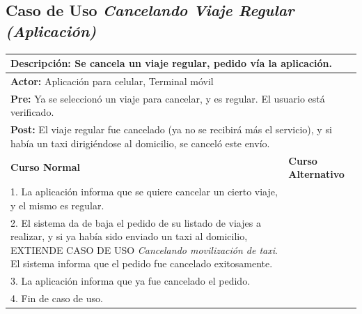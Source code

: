 \documentclass[a4paper]{article}
\begin{document}
\subsection{Caso de Uso \textit{Cancelando Viaje Regular (Aplicaci\'on)}}
\begin{center}
\begin{tabular}{|p{10cm} | p{6cm}|}
\hline
\multicolumn{2}{|p{16cm}|}{\textbf{Descripci\'on:} Se cancela un viaje regular, pedido v\'ia la aplicaci\'on. } \\
\hline
\multicolumn{2}{|l|}{\textbf{Actor:} Aplicaci\'on para celular, Terminal m\'ovil} \\
\hline
\multicolumn{2}{|l|}{\textbf{Pre:} Ya se seleccion\'o un viaje para cancelar, y es regular. El usuario est\'a verificado.} \\
\hline
\multicolumn{2}{|p{16cm}|}{\textbf{Post:} El viaje regular fue cancelado (ya no se recibir\'a m\'as el servicio), y si hab\'ia un taxi dirigi\'endose al domicilio, se cancel\'o este env\'io.}\\
\hline
\textbf{Curso Normal}  & \textbf{Curso Alternativo} \\ \hline
1. La aplicaci\'on informa que se quiere cancelar un cierto viaje, y el mismo es regular. & \\ \hline
2. El sistema da de baja el pedido de su listado de viajes a realizar, y si ya hab\'ia sido enviado un taxi al domicilio, EXTIENDE CASO DE USO \textit{Cancelando movilizaci\'on de taxi}. El sistema informa que el pedido fue cancelado exitosamente. & \\ \hline
3. La aplicaci\'on informa que ya fue cancelado el pedido. & \\ \hline
4. Fin de caso de uso. & \\ \hline
\end{tabular}
\end{center}
\end{document}
